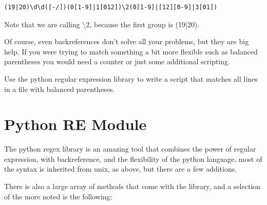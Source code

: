 \begin{verbatim}
(19|20)\d\d([-/])(0[1-9]|1[012])\2(0[1-9]|[12][0-9]|3[01])
\end{verbatim}

Note that we are calling \textbackslash 2, because the first group is (19|20).

Of course, even backreferences don't solve all your problems, but they are big help. If you were trying to match something a bit more flexible such as balanced parentheses you would need a counter or just some additional scripting.


\begin{exercise}
    Use the python regular expression library to write a script that matches all lines in a file with balanced parentheses.
\end{exercise}


\section{Python RE Module}


The python regex library is an amazing tool that combines the power of regular expression, with backreference, and the flexibility of the python language. most of the syntax is inherited from unix, as above, but there are a few additions. 

There is also a large array of methods that come with the library, and a selection of the more noted is the following:


